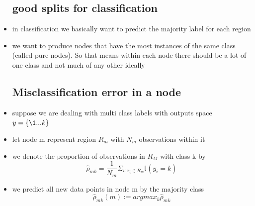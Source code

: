 \documentclass{article}
\begin{document}
\begin{itemize}
\subsection*{good splits for classification}
\item in classification we basically want to predict the majority label for each region 
\item we want to produce nodes that have the most instances of the same class (called pure nodes). So that means within each node there should be a lot of one class and not much of any other ideally
\subsection*{Misclassification   error in a node}
\item suppose we are dealing with multi class labels with outputs space $y=\{\1...k\}$
\item let node m represent region $R_{m}$ with $N_m$ observations within it
\item we denote the proportion of observations in $R_M$ with class k by 
$$\hat{\rho}_{mk}=\frac{1}{N_{m}}\Sigma_{i:x_{i}\in R_{m}}\mathbb{I}(y_i=k)$$ 
\item we predict all new data points in node m by the majority class $$\hat{\rho}_{mk}(m):=argmax_{k}\hat{\rho}_{mk}$$

\end{itemize}
\end{document}
